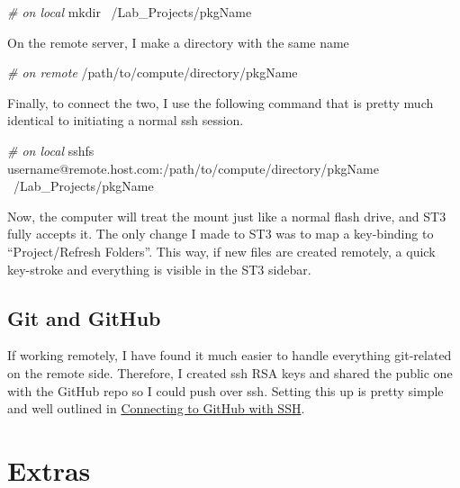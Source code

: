 \documentclass[]{book}
\newenvironment{Shaded}{\begin{snugshade}}{\end{snugshade}}
\newcommand{\CommentTok}[1]{\textcolor[rgb]{0.56,0.35,0.01}{\textit{#1}}}
\newcommand{\FunctionTok}[1]{\textcolor[rgb]{0.00,0.00,0.00}{#1}}
\newcommand{\ExtensionTok}[1]{#1}
\newcommand{\NormalTok}[1]{#1}
\begin{document}
\begin{Shaded}
\begin{Highlighting}[]
\CommentTok{# on local}
\FunctionTok{mkdir}\NormalTok{ ~/Lab_Projects/pkgName}
\end{Highlighting}
\end{Shaded}

On the remote server, I make a directory with the same name

\begin{Shaded}
\begin{Highlighting}[]
\CommentTok{# on remote}
\ExtensionTok{/path/to/compute/directory/pkgName}
\end{Highlighting}
\end{Shaded}

Finally, to connect the two, I use the following command that is pretty
much identical to initiating a normal ssh session.

\begin{Shaded}
\begin{Highlighting}[]
\CommentTok{# on local}
\ExtensionTok{sshfs}\NormalTok{ username@remote.host.com:/path/to/compute/directory/pkgName ~/Lab_Projects/pkgName}
\end{Highlighting}
\end{Shaded}

Now, the computer will treat the mount just like a normal flash drive,
and ST3 fully accepts it. The only change I made to ST3 was to map a
key-binding to ``Project/Refresh Folders''. This way, if new files are
created remotely, a quick key-stroke and everything is visible in the
ST3 sidebar.

\subsection{Git and GitHub}\label{git-and-github-1}

If working remotely, I have found it much easier to handle everything
git-related on the remote side. Therefore, I created ssh RSA keys and
shared the public one with the GitHub repo so I could push over ssh.
Setting this up is pretty simple and well outlined in
\href{https://help.github.com/en/articles/connecting-to-github-with-ssh}{Connecting
to GitHub with SSH}.

\section{Extras}\label{extras}
\end{document}
